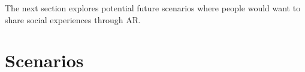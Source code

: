 The next section explores potential future scenarios where people would want to share social experiences through AR.

\pagebreak
\section{Scenarios}




